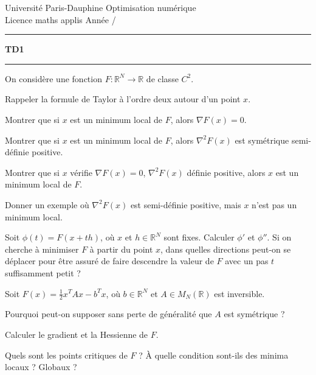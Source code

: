 \documentclass[12pt,a4paper,fleqn]{report}
\makeatletter
\def\cleardoublepage{\clearpage\if@twoside\ifodd\c@page\else\hbox{}\thispagestyle{empty}\newpage\fi\fi}
\newcommand{\R}{\mathbb R}
\makeatother
\begin{document}
\cleardoublepage

\noindent
Universit\'e Paris-Dauphine     \hfill      Optimisation num\'erique\\
Licence maths applis      \hfill      Ann\'ee /

\medskip

\hrule

\medskip



\begin{center}

\textbf{\huge TD1}

\smallskip

\rule{10cm}{0.4pt}

\end{center}



\begin{exercice}
  On considère une fonction $F : \R^{N} \to \R$ de classe $C^{2}$.
  \begin{questions}
  \item Rappeler la formule de Taylor à l'ordre deux autour d'un point $x$.
  \item Montrer que si $x$ est un minimum local de $F$, alors $\nabla
    F(x) = 0$.
  \item Montrer que si $x$ est un minimum local de $F$, alors
    $\nabla^{2} F(x)$ est symétrique semi-définie positive.
  \item Montrer que si $x$ vérifie $\nabla F(x) = 0$, $\nabla^{2}
    F(x)$ définie positive, alors $x$ est un minimum local de $F$.
  \item Donner un exemple où $\nabla^{2} F(x)$ est semi-définie
    positive, mais $x$ n'est pas un minimum local.
  \end{questions}
\end{exercice}

\begin{exercice}
  Soit $\phi(t) = F(x+th)$, où $x$ et $h \in \R^{N}$ sont
  fixes. Calculer $\phi'$ et $\phi''$. Si on cherche à minimiser $F$
  à partir du point $x$, dans quelles directions peut-on se déplacer
  pour être assuré de faire descendre la valeur de $F$ avec un pas $t$
  suffisamment petit ?
\end{exercice}

\begin{exercice}
  Soit $F(x) = \frac 1 2 x^{T} A x - b^{T} x$, où $b \in \R^{N}$ et $A
  \in M_{N}(\R)$ est inversible.
  \begin{questions}
  \item Pourquoi peut-on supposer sans perte de généralité que $A$ est
    symétrique ?
  \item Calculer le gradient et la Hessienne de $F$.
  \item Quels sont les points critiques de $F$ ? À quelle condition
    sont-ils des minima locaux ? Globaux ?
  \end{questions}
\end{exercice}
\end{document}
